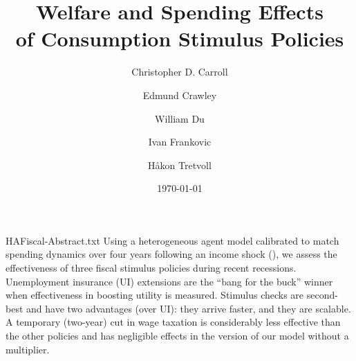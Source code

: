 \documentclass[\PathToRoot/HAFiscal]{subfiles}
\begin{document}
\webonly{
  \newcommand{\versn}{Web}
}

\title{Welfare and Spending Effects \\ of Consumption Stimulus Policies}

\author{Christopher D. Carroll\authNum \and Edmund Crawley\authNum \and William Du\authNum \and Ivan Frankovic\authNum \and H{\aa}kon Tretvoll\authNum}

\keywords{}


\date{\today}

\maketitle

\whenintegrated{\label{abstract}} 
\begin{verbatimwrite}{HAFiscal-Abstract.txt}
  Using a heterogeneous agent model calibrated to match spending dynamics over four years following an income shock (\cite{fagereng-mpc-2021}), we assess the effectiveness of three fiscal stimulus policies during recent recessions.  Unemployment insurance (UI) extensions are the ``bang for the buck'' winner when effectiveness in boosting utility is measured.  Stimulus checks are second-best and have two advantages (over UI): they arrive faster, and they are scalable.  A temporary (two-year) cut in wage taxation is considerably less effective than the other policies and has negligible effects in the version of our model without a multiplier.
\end{verbatimwrite}


\whenintegrated{\label{links}} 
\end{document}
